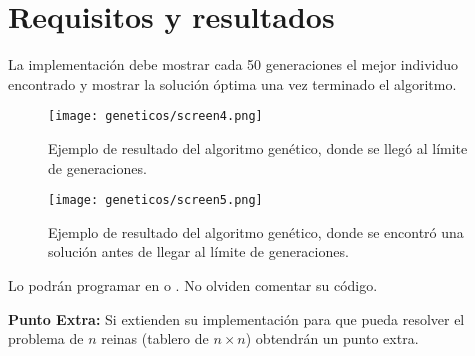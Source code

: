 \section{Requisitos y resultados}

La implementación debe mostrar cada 50 generaciones el mejor individuo encontrado y mostrar la solución óptima una vez terminado el algoritmo.

\begin{figure}[H]
  \centering
  \texttt{[image: geneticos/screen4.png]}
  \caption{Ejemplo de resultado del algoritmo genético, donde se llegó al límite de generaciones.}
\end{figure}

\begin{figure}[H]
  \centering
  \texttt{[image: geneticos/screen5.png]}
  \caption{Ejemplo de resultado del algoritmo genético, donde se encontró una solución antes de llegar al límite de generaciones.}
\end{figure}


\noindent Lo podrán programar en  o . No olviden comentar su código.\bigskip

\noindent \textbf{Punto Extra:} Si extienden su implementación para que pueda resolver el problema de $n$ reinas (tablero de $n \times n$) obtendrán un punto extra.



